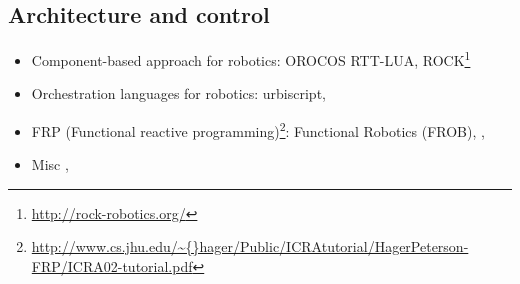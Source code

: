 \subsection{Architecture and control}
\begin{itemize}
\item Component-based approach for robotics: OROCOS RTT-LUA\cite{Klotzbucher:2010fk}, ROCK\footnote{\url{http://rock-robotics.org/}} \cite{Joyeux:2011fk}
\item Orchestration languages for robotics: urbiscript\cite{Baillie:2005},
\item FRP (Functional reactive programming)\footnote{\url{http://www.cs.jhu.edu/\~{}hager/Public/ICRAtutorial/HagerPeterson-FRP/ICRA02-tutorial.pdf}}: Functional Robotics (FROB)\cite{Hager:1999fk}, \cite{Peterson:1999lk}, \cite{Pembeci:2002fc}
\item Misc \cite{Thiry:2008ys}, \cite{Proetzsch:2010vn}
\end{itemize}
